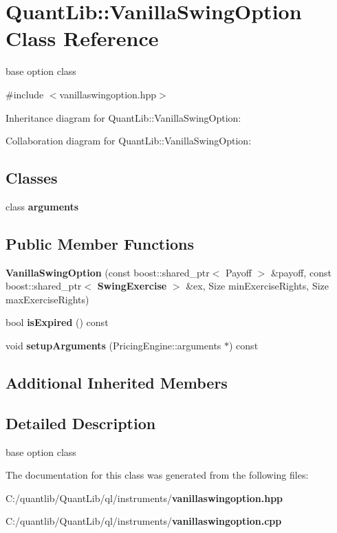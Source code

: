 \section{Quant\+Lib\+:\+:Vanilla\+Swing\+Option Class Reference}
\label{class_quant_lib_1_1_vanilla_swing_option}


base option class  




{\ttfamily \#include $<$vanillaswingoption.\+hpp$>$}



Inheritance diagram for Quant\+Lib\+:\+:Vanilla\+Swing\+Option\+:


Collaboration diagram for Quant\+Lib\+:\+:Vanilla\+Swing\+Option\+:
\subsection*{Classes}
\begin{DoxyCompactItemize}
\item 
class {\bf arguments}
\end{DoxyCompactItemize}
\subsection*{Public Member Functions}
\begin{DoxyCompactItemize}
\item 
{\bfseries Vanilla\+Swing\+Option} (const boost\+::shared\+\_\+ptr$<$ Payoff $>$ \&payoff, const boost\+::shared\+\_\+ptr$<$ {\bf Swing\+Exercise} $>$ \&ex, Size min\+Exercise\+Rights, Size max\+Exercise\+Rights)\label{class_quant_lib_1_1_vanilla_swing_option_aafab4b9d67e55c0f852678a9ff11ae27}

\item 
bool {\bfseries is\+Expired} () const \label{class_quant_lib_1_1_vanilla_swing_option_ac3de58703b1f24ce2c71348e1fcdc055}

\item 
void {\bfseries setup\+Arguments} (Pricing\+Engine\+::arguments $\ast$) const \label{class_quant_lib_1_1_vanilla_swing_option_a0bfb11c5b65e1d96fb1c8faf3f9f2d64}

\end{DoxyCompactItemize}
\subsection*{Additional Inherited Members}


\subsection{Detailed Description}
base option class 

The documentation for this class was generated from the following files\+:\begin{DoxyCompactItemize}
\item 
C\+:/quantlib/\+Quant\+Lib/ql/instruments/{\bf vanillaswingoption.\+hpp}\item 
C\+:/quantlib/\+Quant\+Lib/ql/instruments/{\bf vanillaswingoption.\+cpp}\end{DoxyCompactItemize}
